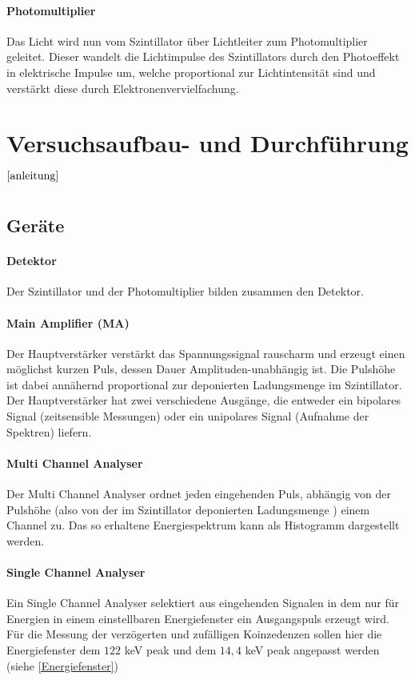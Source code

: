 \documentclass[12pt]{article}
\begin{document}
 \paragraph{Photomultiplier}
 Das Licht wird nun vom Szintillator über Lichtleiter zum Photomultiplier geleitet. Dieser wandelt die Lichtimpulse des Szintillators durch den Photoeffekt in elektrische Impulse um, welche proportional zur Lichtintensität sind und verstärkt diese durch Elektronenvervielfachung.
 

 
\newpage
\section[Versuchsaufbau- und Durchführung]{Versuchsaufbau- und Durchführung $^{\cite{anleitung}}$}
\subsection{Geräte}
\paragraph{Detektor} Der Szintillator und der Photomultiplier bilden zusammen den Detektor.
\paragraph{Main Amplifier (MA)}
Der Hauptverstärker  verstärkt das Spannungssignal rauscharm und erzeugt einen möglichst kurzen Puls, dessen Dauer Amplituden-unabhängig ist. Die Pulshöhe ist dabei annähernd proportional zur deponierten Ladungsmenge im Szintillator. Der Hauptverstärker hat zwei verschiedene Ausgänge, die entweder ein bipolares Signal (zeitsensible Messungen) oder ein unipolares Signal (Aufnahme der Spektren) liefern.
\paragraph{Multi Channel Analyser}
Der Multi Channel Analyser ordnet jeden eingehenden Puls, abhängig von der Pulshöhe (also von der im Szintillator deponierten Ladungsmenge ) einem Channel zu. Das so erhaltene Energiespektrum kann als Histogramm dargestellt werden.
\paragraph{Single Channel Analyser}
Ein Single Channel Analyser selektiert aus eingehenden Signalen in dem nur für Energien in einem einstellbaren Energiefenster ein Ausgangspuls erzeugt wird.  Für die Messung der verzögerten und zufälligen Koinzedenzen sollen hier die Energiefenster dem $122$ keV peak und dem $14,4$ keV peak angepasst werden (siehe \ref{Energiefenster})
\end{document}
